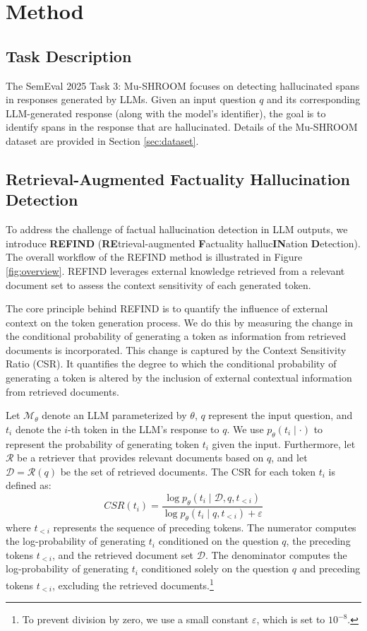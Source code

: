 \section{Method}

\subsection{Task Description}
The SemEval 2025 Task 3: Mu-SHROOM \cite{vazquez-etal-2025-mu-shroom} focuses on detecting hallucinated spans in responses generated by LLMs. 
Given an input question $q$ and its corresponding LLM-generated response (along with the model's identifier), the goal is to identify spans in the response that are hallucinated. Details of the Mu-SHROOM dataset are provided in Section \ref{sec:dataset}.


\subsection{Retrieval-Augmented Factuality Hallucination Detection}

To address the challenge of factual hallucination detection in LLM outputs, we introduce \textbf{REFIND} (\textbf{RE}trieval-augmented \textbf{F}actuality halluc\textbf{IN}ation \textbf{D}etection). 
The overall workflow of the REFIND method is illustrated in Figure \ref{fig:overview}. REFIND leverages external knowledge retrieved from a relevant document set to assess the context sensitivity of each generated token.

The core principle behind REFIND is to quantify the influence of external context on the token generation process.  
We do this by measuring the change in the conditional probability of generating a token as information from retrieved documents is incorporated. 
This change is captured by the Context Sensitivity Ratio (CSR).
It quantifies the degree to which the conditional probability of generating a token is altered by the inclusion of external contextual information from retrieved documents. 

Let $\mathcal{M}_{\theta}$ denote an LLM parameterized by $\theta$, $q$ represent the input question, and $t_i$ denote the $i$-th token in the LLM's response to $q$. 
We use $p_{\theta}(t_i \mid \cdot)$ to represent the probability of generating token $t_i$ given the input.  
Furthermore, let $\mathcal{R}$ be a retriever that provides relevant documents based on $q$, and let $\mathcal{D} = \mathcal{R}(q)$ be the set of retrieved documents. 
The CSR for each token $t_i$ is defined as:
\begin{equation}
    CSR(t_i) = \frac{\log p_{\theta}(t_i \mid \mathcal{D}, q, t_{<i})}{\log p_{\theta}(t_i \mid q, t_{<i}) + \varepsilon}
\end{equation}
where $t_{<i}$ represents the sequence of preceding tokens. The numerator computes the log-probability of generating $t_i$ conditioned on the question $q$, the preceding tokens $t_{<i}$, and the retrieved document set $\mathcal{D}$. The denominator computes the log-probability of generating $t_i$ conditioned solely on the question $q$ and preceding tokens $t_{<i}$, excluding the retrieved documents.\footnote{To prevent division by zero, we use a small constant $\varepsilon$, which is set to $10^{-8}$.}


